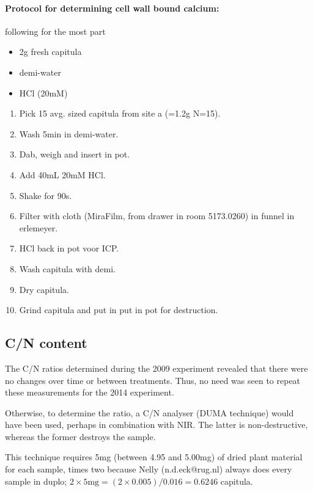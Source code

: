 \documentclass[12pt,a4paper,draft]{article}\usepackage[]{graphicx}\usepackage[]{color}
\begin{document}
\paragraph{Protocol for determining cell wall bound calcium:} following \citet{hajek2009} for the most part

\begin{itemize}
\item 2g fresh capitula
\item demi-water
\item HCl (20mM)
\end{itemize}

\hline

\begin{enumerate}
\item Pick 15 avg. sized capitula from site a (=1.2g N=15).
\item Wash 5min in demi-water.
\item Dab, weigh and insert in pot.
\item Add 40mL 20mM HCl.
\item Shake for 90s.
\item Filter with cloth (MiraFilm, from drawer in room 5173.0260) in funnel in erlemeyer.
\item HCl back in pot voor ICP.
\item Wash capitula with demi.
\item Dry capitula.
\item Grind capitula and put in put in pot for destruction.
\end{enumerate}



\subsection{C/N content}
\label{sec:c/n}

The C/N ratios determined during the 2009 experiment revealed that there were no changes over time or between treatments. Thus, no need was seen to repeat these measurements for the 2014 experiment.

Otherwise, to determine the ratio, a C/N analyser (DUMA technique) would have been used, perhaps in combination with NIR. The latter is non-destructive, whereas the former destroys the sample.

This technique requires 5mg (between 4.95 and 5.00mg) of dried plant material for each sample, times two because Nelly (n.d.eck@rug.nl) always does every sample in duplo; $2 \times 5\mathrm{mg} = (2 \times 0.005) / 0.016 = 0.6246$ capitula. 
\end{document}
